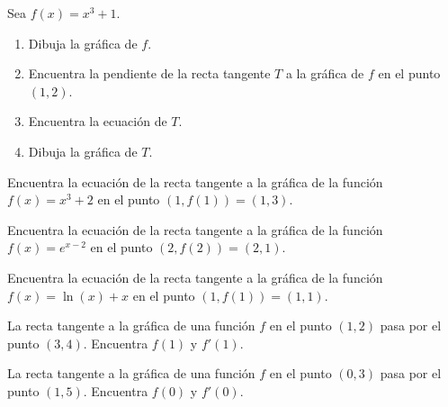 \documentclass[12pt,a4paper]{book}
\begin{document}
    \begin{ejercicio}\label{ej:248}
        Sea $f(x)=x^{3}+1$.
        \begin{enumerate}[nosep]
            \item Dibuja la gráfica de $f$.
            \item Encuentra la pendiente de la recta tangente $T$ a la gráfica de $f$ en el punto
            $(1,2)$.
            \item Encuentra la ecuación de $T$.
            \item Dibuja la gráfica de $T$.
        \end{enumerate}
    \end{ejercicio}

    \begin{ejercicio}\label{ej:249}
        Encuentra la ecuación de la recta tangente a la gráfica de la
        función $f(x)=x^{3}+2$ en el punto $(1,f(1))=(1,3)$.
    \end{ejercicio}

    \begin{ejercicio}\label{ej:250}
        Encuentra la ecuación de la recta tangente a la gráfica de la
        función $f(x)=e^{x-2}$ en el punto $(2,f(2))=(2,1)$.
    \end{ejercicio}

    \begin{ejercicio}\label{ej:251}
        Encuentra la ecuación de la recta tangente a la gráfica de la
        función $f(x)=\ln(x)+x$ en el punto $(1,f(1))=(1,1)$.
    \end{ejercicio}

    \begin{ejercicio}\label{ej:252}
        La recta tangente a la gráfica de una función $f$ en el punto
        $(1,2)$ pasa por el punto $(3,4)$. Encuentra $f(1)$ y $f'(1)$.
    \end{ejercicio}

    \begin{ejercicio}\label{ej:253}
        La recta tangente a la gráfica de una función $f$ en el punto
        $(0,3)$ pasa por el punto $(1,5)$. Encuentra $f(0)$ y $f'(0)$.
    \end{ejercicio}
\end{document}
